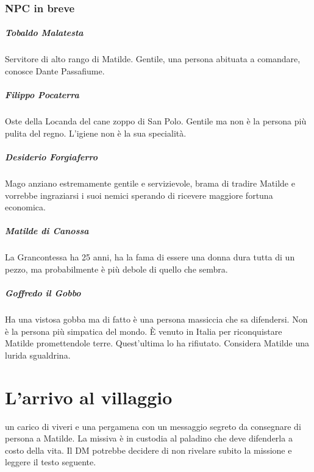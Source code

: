 \documentclass[letterpaper,twocolumn,openany,nodeprecatedcode]{dndbook}
\begin{document}
\subsection{NPC in breve}

\paragraph{Tobaldo Malatesta} Servitore di alto rango di Matilde. Gentile, una persona abituata a comandare, conosce Dante Passafiume.

\paragraph{Filippo Pocaterra} Oste della Locanda del cane zoppo di San Polo. Gentile ma non è la persona più pulita del regno. L'igiene non è la sua specialità.

\paragraph{Desiderio Forgiaferro} Mago anziano estremamente gentile e servizievole, brama di tradire Matilde e vorrebbe ingraziarsi i suoi nemici sperando di ricevere maggiore fortuna economica.

\paragraph{Matilde di Canossa} La Grancontessa ha 25 anni, ha la fama di essere una donna dura tutta di un pezzo, ma probabilmente è più debole di quello che sembra.

\paragraph{Goffredo il Gobbo} Ha una vistosa gobba ma di fatto è una persona massiccia che sa difendersi. Non è la persona più simpatica del mondo. È venuto in Italia per riconquistare Matilde promettendole terre. Quest'ultima lo ha rifiutato. Considera Matilde una lurida sgualdrina.


\chapter{L'arrivo al villaggio}
 un carico di viveri e una pergamena con un messaggio segreto da consegnare di persona a Matilde. La missiva è in custodia al paladino che deve difenderla a costo della vita. Il DM potrebbe decidere di non rivelare subito la missione e leggere il testo seguente.
\end{document}
